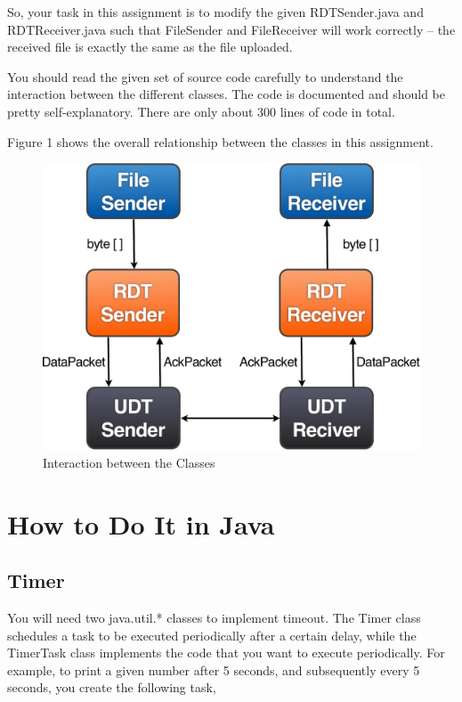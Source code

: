 \documentclass[a4paper,11pt]{exam}
\begin{document}
So, your task in this assignment is to modify the given RDTSender.java and RDTReceiver.java such that FileSender and FileReceiver will work correctly -- the received file is exactly the same as the file uploaded.  

You should read the given set of source code carefully to understand the interaction between the different classes.  The code is documented and should be pretty self-explanatory.  There are only about 300 lines of code in total.

Figure 1 shows the overall relationship between the classes in this assignment.

\begin{figure}
	\begin{center}
	\includegraphics[scale=0.25]{flow-crop.pdf}
	\caption{Interaction between the Classes}
	\end{center}
\end{figure}

\section*{How to Do It in Java}

\subsection*{Timer}

You will need two java.util.* classes to implement timeout.  The Timer class schedules a task to be executed periodically after a certain delay, while the TimerTask class implements the code that you want to execute periodically.  For example, to print a given number after 5 seconds, and subsequently every 5 seconds, you create the following task, 
\newpage
\end{document}
